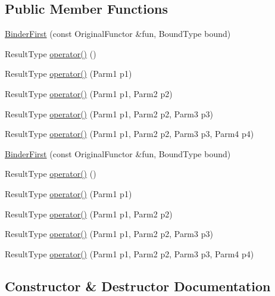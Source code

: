 \subsection*{Public Member Functions}
\begin{DoxyCompactItemize}
\item 
\mbox{\hyperlink{classUtil_1_1BinderFirst_a30caf0805ca9b22a13b3b79babd10054}{Binder\+First}} (const Original\+Functor \&fun, Bound\+Type bound)
\item 
Result\+Type \mbox{\hyperlink{classUtil_1_1BinderFirst_aaf3277caca5fced7454825a2f2920847}{operator()}} ()
\item 
Result\+Type \mbox{\hyperlink{classUtil_1_1BinderFirst_abaf2000002a79a24771bbf52ef7e960c}{operator()}} (Parm1 p1)
\item 
Result\+Type \mbox{\hyperlink{classUtil_1_1BinderFirst_a7abd5ef4f28a0496beb24d4295e1d181}{operator()}} (Parm1 p1, Parm2 p2)
\item 
Result\+Type \mbox{\hyperlink{classUtil_1_1BinderFirst_ac047de2a3489ae79b79d01e873e079c6}{operator()}} (Parm1 p1, Parm2 p2, Parm3 p3)
\item 
Result\+Type \mbox{\hyperlink{classUtil_1_1BinderFirst_ae11ec27f2d62ef1594ef033d8a9f3135}{operator()}} (Parm1 p1, Parm2 p2, Parm3 p3, Parm4 p4)
\item 
\mbox{\hyperlink{classUtil_1_1BinderFirst_a30caf0805ca9b22a13b3b79babd10054}{Binder\+First}} (const Original\+Functor \&fun, Bound\+Type bound)
\item 
Result\+Type \mbox{\hyperlink{classUtil_1_1BinderFirst_aaf3277caca5fced7454825a2f2920847}{operator()}} ()
\item 
Result\+Type \mbox{\hyperlink{classUtil_1_1BinderFirst_abaf2000002a79a24771bbf52ef7e960c}{operator()}} (Parm1 p1)
\item 
Result\+Type \mbox{\hyperlink{classUtil_1_1BinderFirst_a7abd5ef4f28a0496beb24d4295e1d181}{operator()}} (Parm1 p1, Parm2 p2)
\item 
Result\+Type \mbox{\hyperlink{classUtil_1_1BinderFirst_ac047de2a3489ae79b79d01e873e079c6}{operator()}} (Parm1 p1, Parm2 p2, Parm3 p3)
\item 
Result\+Type \mbox{\hyperlink{classUtil_1_1BinderFirst_ae11ec27f2d62ef1594ef033d8a9f3135}{operator()}} (Parm1 p1, Parm2 p2, Parm3 p3, Parm4 p4)
\end{DoxyCompactItemize}


\subsection{Constructor \& Destructor Documentation}
\mbox{\label{classUtil_1_1BinderFirst_a30caf0805ca9b22a13b3b79babd10054}} 
